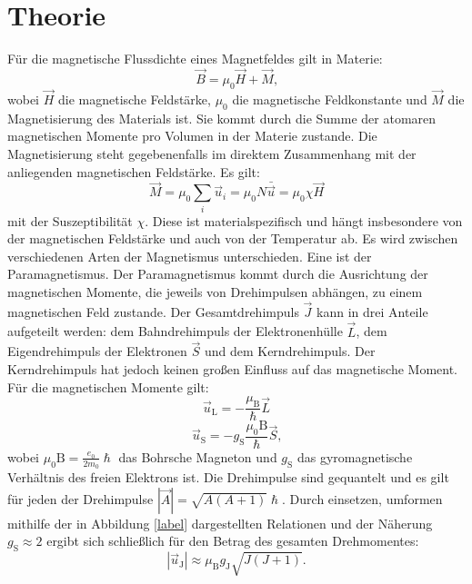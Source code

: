 
\section{Theorie}
\label{sec:Theorie}


Für die magnetische Flussdichte eines Magnetfeldes gilt in Materie:
\begin{equation}
\vec{B}=\mu_0 \vec{H}+\vec{M}\text{,}
\end{equation}
wobei $\vec{H}$ die magnetische Feldstärke, $\mu_0$ die magnetische Feldkonstante und $\vec{M}$ die Magnetisierung des Materials ist. Sie kommt durch die Summe der atomaren magnetischen Momente pro Volumen in der Materie zustande. Die Magnetisierung steht gegebenenfalls im direktem Zusammenhang mit der anliegenden magnetischen Feldstärke. Es gilt:
\begin{equation}
	\vec{M}=\mu_0 \sum_{i} \vec{u}_i = \mu_0 N \bar{\vec{u}} =\mu_0 \chi \vec{H}
\end{equation}
mit der Suszeptibilität $\chi$. Diese ist materialspezifisch und hängt insbesondere von der magnetischen Feldstärke und auch von der Temperatur ab. Es wird zwischen verschiedenen Arten der Magnetismus unterschieden. Eine ist der Paramagnetismus. Der Paramagnetismus kommt durch die Ausrichtung der magnetischen Momente, die jeweils von Drehimpulsen abhängen, zu einem magnetischen Feld zustande. Der Gesamtdrehimpuls $\vec{J}$ kann in drei Anteile aufgeteilt werden: dem Bahndrehimpuls der Elektronenhülle $\vec{L}$, dem Eigendrehimpuls der Elektronen $\vec{S}$ und dem Kerndrehimpuls. Der Kerndrehimpuls hat jedoch keinen großen Einfluss auf das magnetische Moment. Für die magnetischen Momente gilt:
\begin{equation}
	\vec{u}_\text{L}=-\frac{\mu_\text{B}}{\hslash} \vec{L}
\end{equation}
\begin{equation}
	\vec{u}_\text{S}=-g_\text{S} \frac{\mu_0\text{B}}{\hslash} \vec{S}\text{,}
\end{equation}
wobei $\mu_0\text{B}=\frac{e_0}{2 m_0} \hslash$ das Bohrsche Magneton und $g_\text{S}$ das gyromagnetische Verhältnis des freien Elektrons ist. Die Drehimpulse sind gequantelt und es gilt für jeden der Drehimpulse $|\vec{A}|= \sqrt{A(A+1)} \hslash$. Durch einsetzen, umformen mithilfe der in Abbildung \ref{label} dargestellten Relationen und der Näherung $g_\text{S}\approx 2$ ergibt sich schließlich für den Betrag des gesamten Drehmomentes:
\begin{equation}
	|\vec{u}_\text{J}|\approx \mu_\text{B} g_\text{J} \sqrt{J(J+1)} \text{.}
\end{equation}
